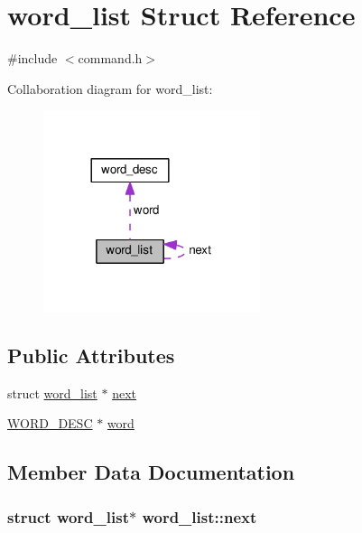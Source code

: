 \hypertarget{structword__list}{}\section{word\+\_\+list Struct Reference}
\label{structword__list}


{\ttfamily \#include $<$command.\+h$>$}



Collaboration diagram for word\+\_\+list\+:
\nopagebreak
\begin{figure}[H]
\begin{center}
\leavevmode
\includegraphics[width=180pt]{structword__list__coll__graph}
\end{center}
\end{figure}
\subsection*{Public Attributes}
\begin{DoxyCompactItemize}
\item 
struct \hyperlink{structword__list}{word\+\_\+list} $\ast$ \hyperlink{structword__list_a73b79d504929eeb584d08f068a046efc}{next}
\item 
\hyperlink{command_8h_a3f0cccf333703e5f6c4168be0db675fa}{W\+O\+R\+D\+\_\+\+D\+E\+SC} $\ast$ \hyperlink{structword__list_ae717a8244fbbcb28ae1debd9da89a0ef}{word}
\end{DoxyCompactItemize}


\subsection{Member Data Documentation}
\subsubsection[{\texorpdfstring{next}{next}}]{\setlength{\rightskip}{0pt plus 5cm}struct {\bf word\+\_\+list}$\ast$ word\+\_\+list\+::next}\hypertarget{structword__list_a73b79d504929eeb584d08f068a046efc}{}\label{structword__list_a73b79d504929eeb584d08f068a046efc}
